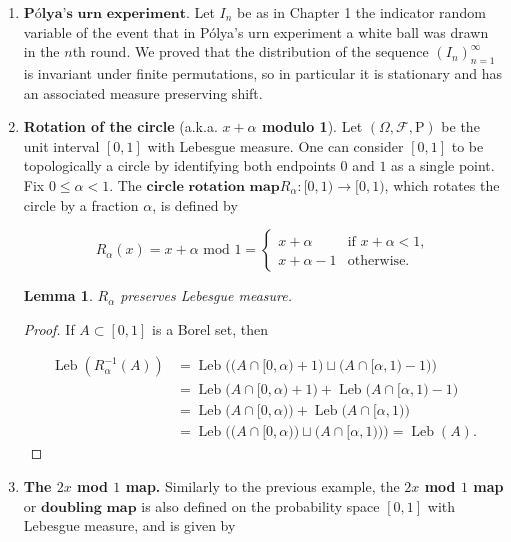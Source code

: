 \documentclass[11pt]{report}
\theoremstyle{plain}
\newtheorem{lem}[thm]{Lemma}
\theoremstyle{definition}
\begin{document}
\begin{enumerate}[label=\arabic*.]
\item $\textbf{Pólya's urn experiment.}$ Let $I_n$ be as in
Chapter 1 the indicator random variable of the event
that in Pólya's urn experiment a white ball was drawn
in the $n$th round. We proved that the distribution
of the sequence $(I_n)_{n=1}^\infty$ is invariant
under finite permutations, so in particular it is
stationary and has an associated measure preserving
shift.

\item \textbf{Rotation of the circle} (a.k.a. \textbf{$x+\alpha$ modulo
1}). Let $(\Omega,\mathcal{F},\mathrm{P})$ be the
unit interval $[0,1]$ with Lebesgue measure. One can
consider $[0,1]$ to be topologically a circle by
identifying both endpoints $0$ and $1$ as a single
point. Fix $0\le \alpha<1$. The
$\textbf{circle rotation map}$$R_\alpha:[0,1)\to[0,1)$, which rotates the circle by
a fraction $\alpha$, is defined by

\[
R_\alpha(x) = x+\alpha \textrm{\ mod\ } 1 = \begin{cases} x+\alpha & \textrm{if }x+\alpha<1, \\ x+\alpha-1&\textrm{otherwise}. \end{cases}
\]

\begin{lem}
$R_\alpha$ preserves Lebesgue measure.
\end{lem}

\begin{proof}
If $A\subset [0,1]$ is a Borel set, then

\begin{align*}
\operatorname{Leb}(R_\alpha^{-1}(A)) &=
\operatorname{Leb}\Big( \big(A\cap[0,\alpha)+1\big) \sqcup \big(A\cap[\alpha,1)-1\big) \Big) \\
&=
\operatorname{Leb}\big(A\cap[0,\alpha)+1\big)
+  \operatorname{Leb}\big(A\cap[\alpha,1)-1\big) \\ &=
\operatorname{Leb}\big(A\cap[0,\alpha)\big)
+  \operatorname{Leb}\big(A\cap[\alpha,1)\big) \\ &=
\operatorname{Leb}\Big( \big(A\cap[0,\alpha)\big) \sqcup \big(A\cap[\alpha,1)\big) \Big)
=
\operatorname{Leb}(A).
\end{align*}

\end{proof}

\item \textbf{The $2x$ mod $1$ map.} Similarly to the previous
example, the \textbf{$2x$ mod $1$ map} or
$\textbf{doubling map}$ is also defined on the
probability space $[0,1]$ with Lebesgue measure, and
is given by


\end{enumerate}
\end{document}
